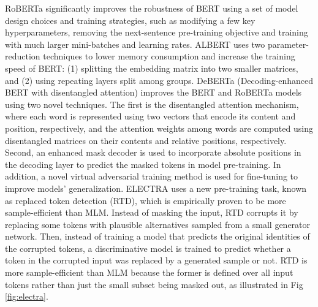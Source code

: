 \documentclass[conference]{IEEEtran}
\begin{document}
RoBERTa \cite{liu2019roberta} significantly improves the robustness of BERT using a set of model design choices and training strategies, such as modifying a few key hyperparameters, removing the next-sentence pre-training objective and training with much larger mini-batches and learning rates.
ALBERT \cite{lan2019albert} uses two parameter-reduction techniques to lower memory consumption and increase the training speed of BERT: (1) splitting the embedding matrix into two smaller matrices, and (2) using repeating layers split among groups.   
DeBERTa (Decoding-enhanced BERT with disentangled attention) \cite{he2020deberta} improves the BERT and RoBERTa models using two novel techniques.
The first is the disentangled attention mechanism, where
each word is represented using two vectors that encode its content and position, respectively, and the attention weights among words are computed using disentangled matrices on their contents and relative positions, respectively. Second, an enhanced mask decoder is used to incorporate absolute positions in the decoding layer to predict the masked tokens in model pre-training.
In addition, a novel virtual adversarial training method is used for fine-tuning to improve models’ generalization.
ELECTRA \cite{clark2020electra} uses a new pre-training task, known as replaced token detection (RTD), which is empirically proven to be more sample-efficient than MLM.
Instead of masking the input, RTD corrupts it by replacing some tokens with plausible alternatives sampled from a small generator network. Then, instead of training a model that predicts the original identities of the corrupted tokens, a discriminative model is trained to predict whether a token in the corrupted input was replaced by a generated sample or not.
RTD is more sample-efficient than MLM because the former is defined over all input tokens rather than just the small subset being masked out, as illustrated in Fig \ref{fig:electra}.
\end{document}

